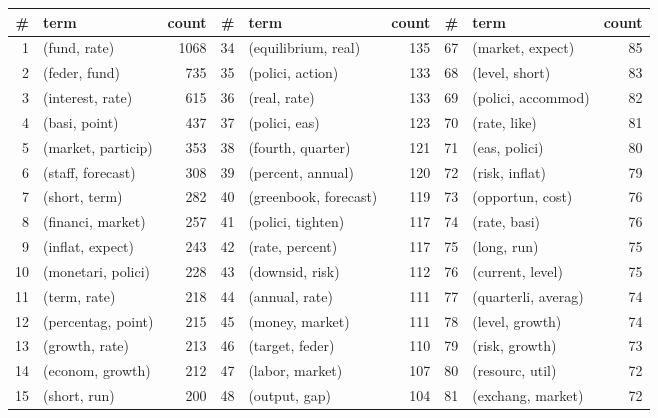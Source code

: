 \begin{tabular}{rlrrlrrlr}
\toprule
  \# &                term &  count &   \# &                   term &  count &   \# &                  term &  count \\
\midrule
  1 &        (fund, rate) &   1068 &  34 &    (equilibrium, real) &    135 &  67 &      (market, expect) &     85 \\
  2 &       (feder, fund) &    735 &  35 &       (polici, action) &    133 &  68 &        (level, short) &     83 \\
  3 &    (interest, rate) &    615 &  36 &           (real, rate) &    133 &  69 &    (polici, accommod) &     82 \\
  4 &       (basi, point) &    437 &  37 &          (polici, eas) &    123 &  70 &          (rate, like) &     81 \\
  5 &  (market, particip) &    353 &  38 &      (fourth, quarter) &    121 &  71 &         (eas, polici) &     80 \\
  6 &   (staff, forecast) &    308 &  39 &      (percent, annual) &    120 &  72 &        (risk, inflat) &     79 \\
  7 &       (short, term) &    282 &  40 &  (greenbook, forecast) &    119 &  73 &      (opportun, cost) &     76 \\
  8 &   (financi, market) &    257 &  41 &      (polici, tighten) &    117 &  74 &          (rate, basi) &     76 \\
  9 &    (inflat, expect) &    243 &  42 &        (rate, percent) &    117 &  75 &           (long, run) &     75 \\
 10 &  (monetari, polici) &    228 &  43 &        (downsid, risk) &    112 &  76 &      (current, level) &     75 \\
 11 &        (term, rate) &    218 &  44 &         (annual, rate) &    111 &  77 &   (quarterli, averag) &     74 \\
 12 &  (percentag, point) &    215 &  45 &        (money, market) &    111 &  78 &       (level, growth) &     74 \\
 13 &      (growth, rate) &    213 &  46 &        (target, feder) &    110 &  79 &        (risk, growth) &     73 \\
 14 &    (econom, growth) &    212 &  47 &        (labor, market) &    107 &  80 &       (resourc, util) &     72 \\
 15 &        (short, run) &    200 &  48 &          (output, gap) &    104 &  81 &     (exchang, market) &     72 \\

\end{tabular}

